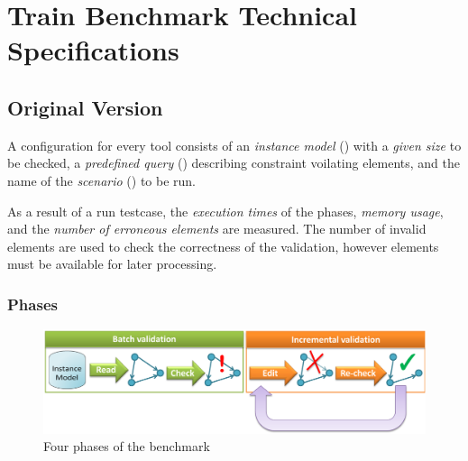 \chapter{Train Benchmark Technical Specifications}


\section{Original Version}

A  configuration for every tool consists of an \emph{instance model} () with a \emph{given size} to be checked, a \emph{predefined query} () describing constraint voilating elements, and the name of the \emph{scenario} () to be run.

As a result of a run testcase, the \emph{execution times} of the phases, \emph{memory usage}, and the \emph{number of erroneous elements} are measured. The number of invalid elements are used to check the correctness of the validation, however elements must be available for later processing. 


\subsection{Phases}
\label{sec:phases}

\begin{figure}[Htb]
		\centering
		\includegraphics[scale=0.5]{figures/phases}
		\caption{Four phases of the benchmark}
		\label{fig:phases}
\end{figure}

